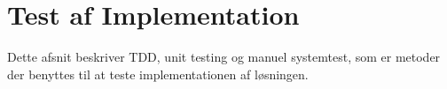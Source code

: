 \chapter{Test af Implementation}

Dette afsnit beskriver TDD, unit testing og manuel systemtest, som er metoder der benyttes til at teste implementationen af løsningen.



